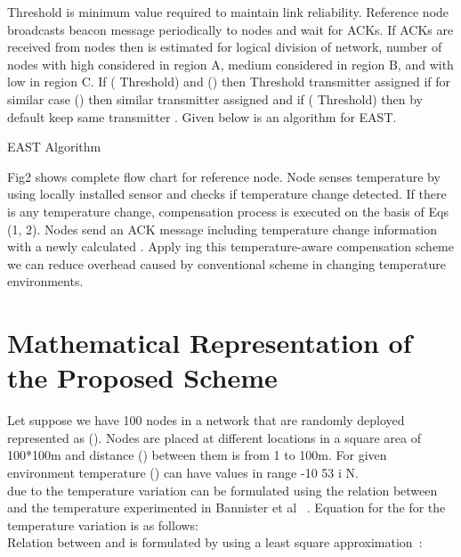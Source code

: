 \documentclass[12pt, conference, compsocconf, onecolumn, draftcls]{IEEEtran}
\begin{document}
Threshold  is minimum value required to maintain link reliability. Reference node broadcasts beacon message periodically to nodes and wait for ACKs. If ACKs are received from nodes then  is estimated for logical division of network, number of nodes with high   considered in region A, medium  considered in region B, and with low  in region C. If (   Threshold) and  () then Threshold transmitter  assigned if  for similar case () then similar transmitter  assigned and if  (    Threshold) then by default keep same transmitter . Given below is an algorithm for EAST.
\begin{algorithm}
\caption{EAST Algorithm}
\begin{algorithmic}[1]
\STATE    
\STATE      
\STATE         
\STATE     
\STATE       
\STATE      
\STATE      
\STATE    
\STATE   
\STATE   
\STATE     
\STATE     
\IF{}
\IF{}
\STATE 
\ELSE
\STATE 
\ENDIF
\ENDIF
\IF{}
\STATE 
\ENDIF
\STATE 
\end{algorithmic}
\end{algorithm}

Fig2 shows complete flow chart for reference node. Node senses temperature by using locally installed sensor and checks if temperature change detected. If there is any temperature change, compensation process is executed on the basis of Eqs (1, 2). Nodes send an ACK message including temperature change information with a newly calculated . Apply ing this temperature-aware compensation scheme we can reduce overhead caused by conventional scheme in changing temperature environments.

\section{Mathematical Representation of the Proposed Scheme}
Let suppose we have 100 nodes in a network that are randomly deployed represented as (). Nodes are  placed at different locations in a square area of 100*100m and distance () between them is from 1 to 100m. For given environment temperature () can have values  in range
-10    53     i  N.\\
 due to the temperature variation can be formulated using the relation between  and the temperature experimented in Bannister et al ~\cite{12}. Equation for the  for the temperature variation is as follows:\\


Relation between and  is formulated by using a least square approximation~\cite{12}:\\
\end{document}
